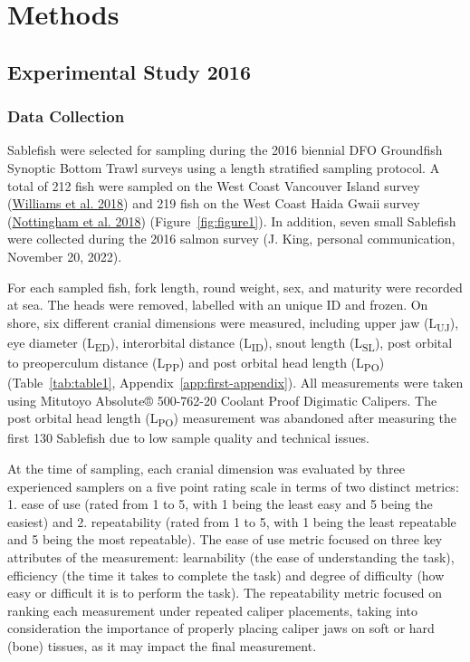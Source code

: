 \documentclass[12pt]{article}\usepackage[]{graphicx}\usepackage[]{color}
\begin{document}
\hypertarget{methods}{%
\section{Methods}\label{methods}}

\hypertarget{experimental-study-2016}{%
\subsection{Experimental Study 2016}\label{experimental-study-2016}}

\hypertarget{data-collection}{%
\subsubsection{Data Collection}\label{data-collection}}

Sablefish were selected for sampling during the 2016 biennial DFO Groundfish Synoptic Bottom Trawl surveys using a length stratified sampling protocol. A total of 212 fish were sampled on the West Coast Vancouver Island survey (\protect\hyperlink{ref-Williams2018}{Williams et al. 2018}) and 219 fish on the West Coast Haida Gwaii survey (\protect\hyperlink{ref-Nottingham2018}{Nottingham et al. 2018}) (Figure~\ref{fig:figure1}). In addition, seven small Sablefish were collected during the 2016 salmon survey (J. King, personal communication, November 20, 2022).

For each sampled fish, fork length, round weight, sex, and maturity were recorded at sea. The heads were removed, labelled with an unique ID and frozen. On shore, six different cranial dimensions were measured, including upper jaw (L\textsubscript{UJ}), eye diameter (L\textsubscript{ED}), interorbital distance (L\textsubscript{ID}), snout length (L\textsubscript{SL}), post orbital to preoperculum distance (L\textsubscript{PP}) and post orbital head length (L\textsubscript{PO}) (Table~\ref{tab:table1}, Appendix~\ref{app:first-appendix}). All measurements were taken using Mitutoyo Absolute® 500-762-20 Coolant Proof Digimatic Calipers. The post orbital head length (L\textsubscript{PO}) measurement was abandoned after measuring the first 130 Sablefish due to low sample quality and technical issues.

At the time of sampling, each cranial dimension was evaluated by three experienced samplers on a five point rating scale in terms of two distinct metrics: 1. ease of use (rated from 1 to 5, with 1 being the least easy and 5 being the easiest) and 2. repeatability (rated from 1 to 5, with 1 being the least repeatable and 5 being the most repeatable). The ease of use metric focused on three key attributes of the measurement: learnability (the ease of understanding the task), efficiency (the time it takes to complete the task) and degree of difficulty (how easy or difficult it is to perform the task). The repeatability metric focused on ranking each measurement under repeated caliper placements, taking into consideration the importance of properly placing caliper jaws on soft or hard (bone) tissues, as it may impact the final measurement.
\end{document}
